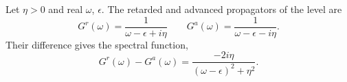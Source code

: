 \documentclass{article}
\begin{document}
Let $\eta>0$ and real $\omega$, $\epsilon$. The retarded and advanced propagators of the level are
\begin{equation}
G^r(\omega) = \frac{1}{\omega-\epsilon+i\eta} \qquad G^a(\omega) = \frac{1}{\omega-\epsilon-i\eta} .
\label{eq:gra}
\end{equation}
Their difference gives the spectral function,
\begin{equation}
G^r(\omega) - G^a(\omega) = \frac{-2i\eta}{(\omega-\epsilon)^2+\eta^2} .
\label{eq:spec}
\end{equation}
\end{document}
